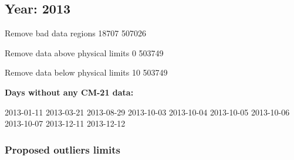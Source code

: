 \documentclass[
  10pt,
  a4paper,oneside]{article}
\begin{document}
\FloatBarrier

\newpage

\hypertarget{year-2013}{%
\subsection{Year: 2013}\label{year-2013}}

Remove bad data regions
18707 507026

Remove data above physical limits
0 503749

Remove data below physical limits
10 503749

\textbf{Days without any CM-21 data:}

2013-01-11 2013-03-21 2013-08-29 2013-10-03 2013-10-04 2013-10-05 2013-10-06 2013-10-07 2013-12-11 2013-12-12

\hypertarget{proposed-outliers-limits-20}{%
\subsubsection{Proposed outliers limits}\label{proposed-outliers-limits-20}}

\footnotesize
\end{document}
